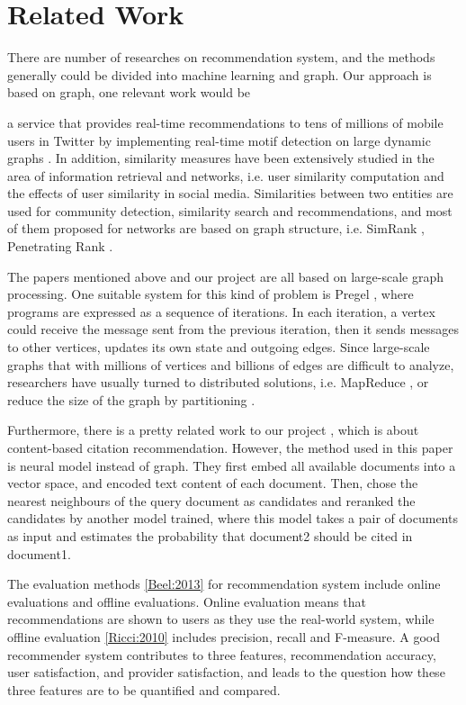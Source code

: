 \section{Related Work} \label{sec:related-work}

There are number of researches on recommendation system, and the methods generally could be divided into machine learning and graph. Our approach is based on graph, one relevant work would be 

a service that provides real-time recommendations to tens of millions of mobile users in Twitter by implementing real-time motif detection on large dynamic graphs \cite{Gupta:2014}. In addition, similarity measures \cite{Goel2013} have been extensively studied in the area of information retrieval and networks, i.e. user similarity computation and the effects of user similarity in social media. Similarities between two entities are used for community detection, similarity search and recommendations, and most of them proposed for networks are based on graph structure, i.e. SimRank \cite{Jeh:2002}, Penetrating Rank \cite{Zhao:2009}. 

The papers mentioned above and our project are all based on large-scale graph processing. One suitable system for this kind of problem is Pregel \cite{Malewicz:2010}, where programs are expressed as a sequence of iterations. In each iteration, a vertex could receive the message sent from the previous iteration, then it sends messages to other vertices, updates its own state and outgoing edges. Since large-scale graphs that with millions of vertices and billions of edges are difficult to analyze, researchers have usually turned to distributed solutions, i.e. MapReduce \cite{Lin:2010}, or reduce the size of the graph by partitioning \cite{Karypis:1998}.

Furthermore, there is a pretty related work to our project \cite{DBLP}, which is about content-based citation recommendation. However, the method used in this paper is neural model instead of graph. They first embed all available documents into a vector space, and encoded text content of each document. Then, chose the nearest neighbours of the query document as candidates and reranked the candidates by another model trained, where this model takes a pair of documents as input and estimates the probability that document2 should be cited in document1.

The evaluation methods \ref{Beel:2013} for recommendation system include online evaluations and offline evaluations. Online evaluation means that recommendations are shown to users as they use the real-world system, while offline evaluation \ref{Ricci:2010} includes precision, recall and F-measure. A good recommender system contributes to three features, recommendation accuracy, user satisfaction, and provider satisfaction, and leads to the question how these three features are to be quantified and compared.

